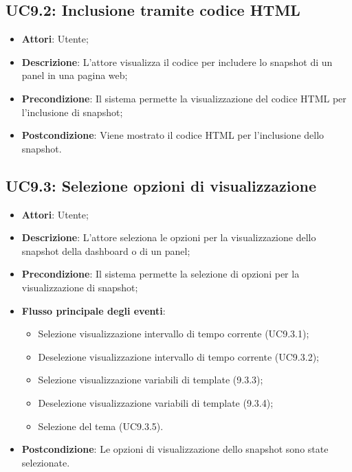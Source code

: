 \subsection{UC9.2: Inclusione tramite codice HTML}
\begin{itemize}
	\item \textbf{Attori}: Utente;
	\item \textbf{Descrizione}: L'attore visualizza il codice  per includere lo snapshot di un panel in una pagina web;
	\item \textbf{Precondizione}: Il sistema permette la visualizzazione del codice HTML per l'inclusione di snapshot;
	\item \textbf{Postcondizione}: Viene mostrato il codice HTML per l'inclusione dello snapshot.
\end{itemize}

\subsection{UC9.3: Selezione opzioni di visualizzazione}
\begin{itemize}
	\item \textbf{Attori}: Utente;
	\item \textbf{Descrizione}: L'attore seleziona le opzioni per la visualizzazione dello snapshot della dashboard o di un panel;
	\item \textbf{Precondizione}: Il sistema permette la selezione di opzioni per la visualizzazione di snapshot;
	\item \textbf{Flusso principale degli eventi}:
	\begin{itemize}
		\item Selezione visualizzazione intervallo di tempo corrente (UC9.3.1);
		\item Deselezione visualizzazione intervallo di tempo corrente (UC9.3.2);
		\item Selezione visualizzazione variabili di template (9.3.3);
		\item Deselezione visualizzazione variabili di template (9.3.4);
		\item Selezione del tema (UC9.3.5).
	\end{itemize}
	\item \textbf{Postcondizione}: Le opzioni di visualizzazione dello snapshot sono state selezionate.
\end{itemize}

